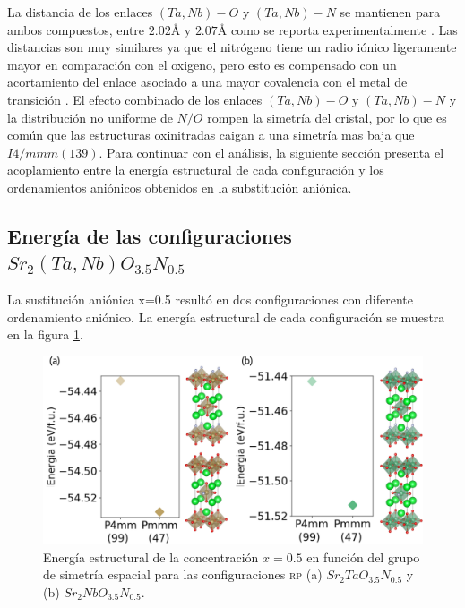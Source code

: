 La distancia de los enlaces $(Ta,Nb)-O$ y $(Ta,Nb)-N$ se mantienen para ambos compuestos, entre $2.02  \si{\angstrom}$ y $2.07  \si{\angstrom}$ como se reporta experimentalmente \cite{Diot1999CrystalN,Tobias2004,Clarke2002,Ebbinghaus2004PowderK,Tobias2010ChemInform2.}. Las distancias son muy similares ya que el nitrógeno tiene un radio iónico ligeramente mayor en comparación con el oxigeno, pero esto es compensado con un acortamiento del enlace asociado a una mayor covalencia con el metal de transición \cite{Yang2011,Ebbinghaus2004PowderK}.  El efecto combinado de los enlaces $(Ta,Nb)-O$ y $(Ta,Nb)-N$ y la distribución no uniforme de $N/O$ rompen la simetría del cristal, por lo que es común que las estructuras oxinitradas caigan a una simetría mas baja que $I4/mmm(139)$. Para continuar con el análisis, la siguiente sección presenta el acoplamiento entre la energía estructural de cada configuración y los ordenamientos aniónicos obtenidos en la substitución aniónica.

 
 
\subsection{Energía de las configuraciones $Sr_{2}(Ta,Nb)O_{3.5}N_{0.5}$}

La sustitución aniónica x=0.5 resultó en dos configuraciones con diferente ordenamiento aniónico. La energía estructural de cada configuración se muestra en la figura \ref{Fig. 35u-rp}.

\begin{figure}[H]
    \centering
    \includegraphics[width=\textwidth]{Figs/35u-rp.png}
    \caption{Energía estructural de la concentración $x=0.5$ en función del grupo de simetría espacial para las configuraciones \textsc{rp} (a) $Sr_{2}TaO_{3.5}N_{0.5}$ y (b) $Sr_{2}NbO_{3.5}N_{0.5}$.}
    \label{Fig. 35u-rp}
\end{figure}

